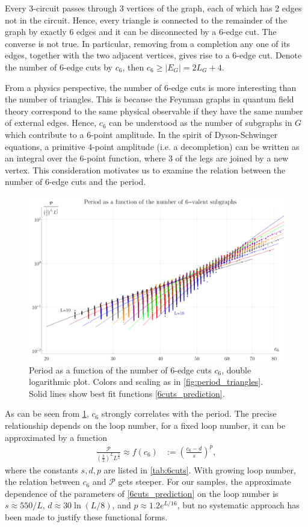 \documentclass[11pt,a4paper]{article}
\newcommand{\abs}[1]{\lvert #1 \rvert}
\newcommand{\period}{\mathcal P}
\renewcommand{\|}{\rule[-0.4ex]{0.2ex}{1.2em}}
\begin{document}
Every 3-circuit passes through 3 vertices of the graph, each of which has 2 edges not in the circuit. Hence, every triangle is connected to the remainder of the graph by exactly 6 edges and it can be disconnected by a 6-edge cut. The converse is not true. In particular,  removing from a completion any one of its edges, together with the two adjacent vertices, gives rise to a 6-edge cut. Denote the number of 6-edge cuts by $c_6$, then $c_6 \geq \abs{E_G}= 2 L_G + 4$.  
 
From a physics perspective, the number of 6-edge cuts is more interesting than the number of triangles. This is because the Feynman graphs in quantum field theory correspond to the same physical observable if they have the same number of external edges. Hence, $c_6$ can be understood as the number of subgraphs in $G$ which contribute to a 6-point amplitude. In the spirit of Dyson-Schwinger equations, a primitive 4-point amplitude (i.e. a decompletion) can be written as an integral over the 6-point function,   where 3 of the legs are joined by a new vertex. This   consideration  motivates us to examine the relation between the number of 6-edge cuts and the period.


\begin{figure}[htb]
	\centering
	\includegraphics[width=.9\linewidth]{period_6cuts}
	\caption{Period  as a function of the number of 6-edge cuts $c_6$, double logarithmic plot. Colors and scaling as in \cref{fig:period_triangles}. Solid lines show best fit functions \cref{6cuts_prediction}.}
	\label{fig:period_6cuts}
\end{figure}

As can be seen from \cref{fig:period_6cuts}, $c_6$ strongly correlates with the period. The precise relationship depends on the loop number, for a fixed loop number, it can be approximated by a function
\begin{align}\label{6cuts_prediction}
	\frac{\period}{\left( \frac 32 \right) ^L L^{\frac 52}}\approx f(c_6) &:= \left( \frac{c_6-d}{s}  \right) ^p,
\end{align}
where the constants $s,d,p$ are listed in  \cref{tab:6cuts}. With growing loop number, the relation between $c_6$ and $\period$ gets steeper. For our samples, the approximate dependence of the parameters of \cref{6cuts_prediction} on the loop number is $s \approx 550/L$, $d \approx 30 \ln (L/8)$, and $p \approx 1.2 e^{L/16}$, but no systematic approach has been made to justify these functional forms. 
\end{document}
